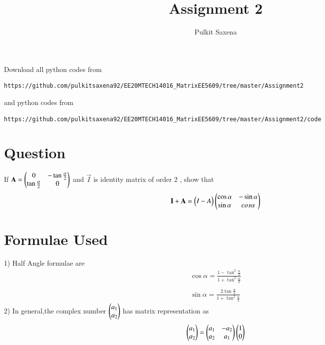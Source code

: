 \documentclass[journal,12pt,onecolumn]{IEEEtran}
\begin{document}
     \def\rightbox#1{\makebox[0in][r]{#1}}
     \def\centbox#1{\makebox[0in]{#1}}
     \def\topbox#1{\raisebox{-\baselineskip}[0in][0in]{#1}}
     \def\midbox#1{\raisebox{-0.5\baselineskip}[0in][0in]{#1}}
\vspace{3cm}
\title{Assignment 2}
\author{Pulkit Saxena}
\maketitle
\bigskip
\renewcommand{\thefigure}{1}
\renewcommand{\thetable}{\theenumi}
Download all python codes from 
\begin{lstlisting}
https://github.com/pulkitsaxena92/EE20MTECH14016_MatrixEE5609/tree/master/Assignment2
\end{lstlisting}
%
and python codes from 
%
\begin{lstlisting}
https://github.com/pulkitsaxena92/EE20MTECH14016_MatrixEE5609/tree/master/Assignment2/code
\end{lstlisting}
\section{\textbf{Question}}
If $\mathbf{A}=\begin{pmatrix}0 & -\tan\frac{\alpha}{2} \\ \tan\frac{\alpha}{2} & 0 \end{pmatrix}$ and $\vec{I}$ is identity matrix of order 2 , show that
\begin{align}
  \mathbf{I}+\mathbf{A}=\begin{pmatrix}I-A\end{pmatrix}\begin{pmatrix}\cos\alpha & -\sin\alpha \\ \sin\alpha & cos\alpha\end{pmatrix}
\end{align}
\section{\textbf{Formulae Used}}
1) Half Angle formulae are
\begin{align}
\cos\alpha=\frac{1-\tan^2\frac{\alpha}{2}}{1+\tan^2\frac{\alpha}{2}}\\ \\
\sin\alpha=\frac{2\tan\frac{\alpha}{2}}{1+\tan^2\frac{\alpha}{2}}
\end{align}
 2) In general,the complex number $\begin{pmatrix}a_1\\a_2\end{pmatrix}$ has matrix representation as
\begin{align}
    \begin{pmatrix}a_1\\a_2\end{pmatrix}=\begin{pmatrix}a_1 & -a_2\\a_2 & a_1\end{pmatrix}\begin{pmatrix}1\\0\end{pmatrix}
\end{align}
\end{document}
